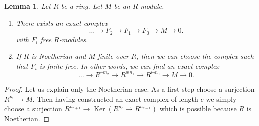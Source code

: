 \documentclass[10pt,a4paper]{amsart}
\theoremstyle{plain}
\newtheorem{lemma}[subsection]{Lemma}
\theoremstyle{definition}
\theoremstyle{remark}
\numberwithin{equation}{subsection}
\def\Ker{\mathop{\mathrm{Ker}}}
\begin{document}
\begin{lemma}
\label{lemma-resolution-by-finite-free}
Let $R$ be a ring. Let $M$ be an $R$-module.
\begin{enumerate}
\item There exists an exact complex
$$
\ldots \to F_2 \to F_1 \to F_0 \to M \to 0.
$$
with $F_i$ free $R$-modules.
\item If $R$ is Noetherian and $M$ finite over $R$, then we
can choose the complex such that $F_i$ is finite free.
In other words, we can find an exact complex
$$
\ldots \to R^{\oplus n_2} \to R^{\oplus n_1} \to R^{\oplus n_0} \to M \to 0.
$$
\end{enumerate}
\end{lemma}

\begin{proof}
Let us explain only the Noetherian case.
As a first step choose a surjection $R^{n_0} \to M$.
Then having constructed an exact complex of length
$e$ we simply choose a surjection $R^{n_{e + 1}} \to
\Ker(R^{n_e} \to R^{n_{e-1}})$ which is possible
because $R$ is Noetherian.
\end{proof}
\end{document}
